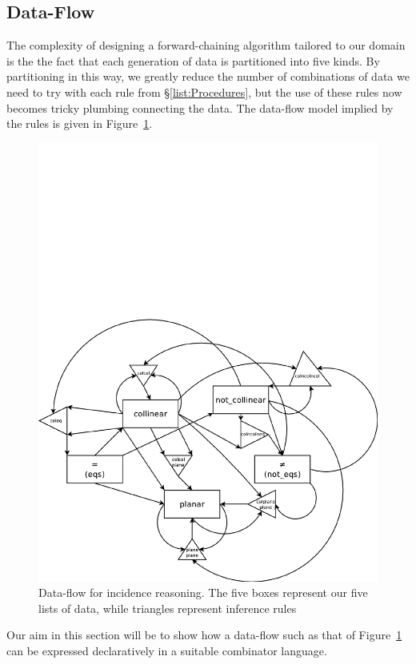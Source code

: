 \subsection{Data-Flow}
The complexity of designing a forward-chaining algorithm tailored to our domain is the the fact that each generation of data is partitioned into five kinds. By partitioning in this way, we greatly reduce the number of combinations of data we need to try with each rule from \S\ref{list:Procedures}, but the use of these rules now becomes tricky plumbing connecting the data. The data-flow model implied by the rules is given in Figure~\ref{fig:DataFlow}.

\begin{figure}
\centering\includegraphics[scale=0.5]{automation/DataFlow}
\caption{Data-flow for incidence reasoning. The five boxes represent our five lists of data, while triangles represent inference rules}
\label{fig:DataFlow}
\end{figure}

Our aim in this section will be to show how a data-flow such as that of Figure~\ref{fig:DataFlow} can be expressed declaratively in a suitable combinator language.

